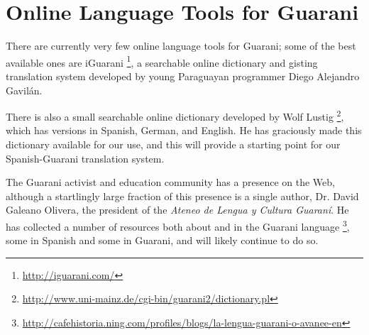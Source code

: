 \section{Online Language Tools for Guarani}
There are currently very few online language tools for Guarani; some of the
best available ones are iGuarani \footnote{\url{http://iguarani.com/}}, a
searchable online dictionary and gisting translation system developed by young
Paraguayan programmer Diego Alejandro Gavilán.

There is also a small searchable online dictionary developed by Wolf Lustig
\footnote{\url{http://www.uni-mainz.de/cgi-bin/guarani2/dictionary.pl}},
which has versions in Spanish, German, and English. He has graciously made this
dictionary available for our use, and this will provide a starting point for
our Spanish-Guarani translation system.

The Guarani activist and education community has a presence on the Web,
although a startlingly large fraction of this presence is a single author,
Dr. David Galeano Olivera, the president of the \emph{Ateneo de Lengua y
Cultura Guaraní}. He has collected a number of resources both about and in the
Guarani language
\footnote{\url{http://cafehistoria.ning.com/profiles/blogs/la-lengua-guarani-o-avanee-en}},
some in Spanish and some in Guarani, and will likely continue to do so.
